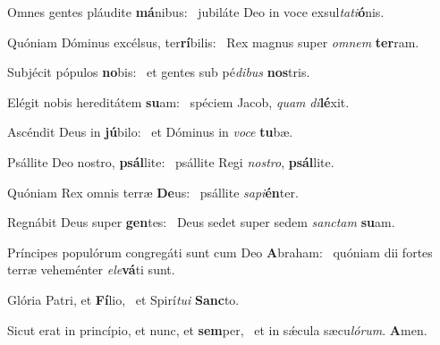 \item Omnes gentes pláudite \textbf{má}nibus:~\psstar{} jubiláte Deo in voce exsul\textit{tati}\textbf{ó}nis.
\item Quóniam Dóminus excélsus, ter\textbf{rí}bilis:~\psstar{} Rex magnus super \textit{omnem} \textbf{ter}ram.
\item Subjécit pópulos \textbf{no}bis:~\psstar{} et gentes sub pé\textit{dibus} \textbf{nos}tris.
\item Elégit nobis hereditátem \textbf{su}am:~\psstar{} spéciem Jacob, \textit{quam} \textit{di}\textbf{lé}xit.
\item Ascéndit Deus in \textbf{jú}bilo:~\psstar{} et Dóminus in \textit{voce} \textbf{tu}bæ.
\item Psállite Deo nostro, \textbf{psál}lite:~\psstar{} psállite Regi \textit{nostro}, \textbf{psál}lite.
\item Quóniam Rex omnis terræ \textbf{De}us:~\psstar{} psállite \textit{sapi}\textbf{én}ter.
\item Regnábit Deus super \textbf{gen}tes:~\psstar{} Deus sedet super sedem \textit{sanctam} \textbf{su}am.
\item Príncipes populórum congre\-gáti sunt cum Deo \textbf{A}braham:~\psstar{} quóniam dii fortes terræ veheménter \textit{ele}\textbf{vá}ti sunt.
\item Glória Patri, et \textbf{Fí}lio,~\psstar{} et Spirí\textit{tui} \textbf{Sanc}to.
\item Sicut erat in princípio, et nunc, et \textbf{sem}per,~\psstar{} et in sǽcula sæcu\textit{lórum}. \textbf{A}men.

